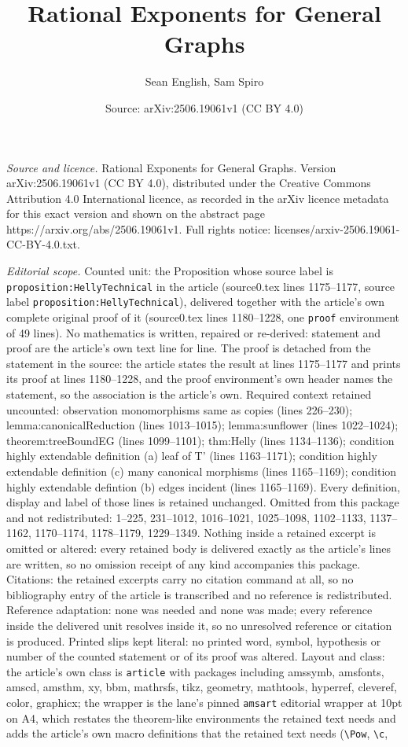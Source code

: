 \documentclass[10pt,a4paper]{amsart}
\title[Rational Exponents for General Graphs]{Rational Exponents for General Graphs}
\author{Sean English, Sam Spiro}
\date{Source: arXiv:2506.19061v1 (CC BY 4.0)}
\begin{document}
\maketitle

\noindent\emph{Source and licence.} Rational Exponents for General Graphs. Version arXiv:2506.19061v1 (CC BY 4.0), distributed under the Creative Commons Attribution 4.0 International licence, as recorded in the arXiv licence metadata for this exact version and shown on the abstract page https://arxiv.org/abs/2506.19061v1. Full rights notice: licenses/arxiv-2506.19061-CC-BY-4.0.txt.\par\smallskip

\noindent\textit{Editorial scope.} Counted unit: the Proposition whose source label is \texttt{proposition:HellyTechnical} in the article (source0.tex lines 1175--1177, source label \texttt{proposition:HellyTechnical}), delivered together with the article's own complete original proof of it (source0.tex lines 1180--1228, one \texttt{proof} environment of 49 lines). No mathematics is written, repaired or re-derived: statement and proof are the article's own text line for line. The proof is detached from the statement in the source: the article states the result at lines 1175--1177 and prints its proof at lines 1180--1228, and the proof environment's own header names the statement, so the association is the article's own. Required context retained uncounted: observation monomorphisms same as copies (lines 226--230); lemma:canonicalReduction (lines 1013--1015); lemma:sunflower (lines 1022--1024); theorem:treeBoundEG (lines 1099--1101); thm:Helly (lines 1134--1136); condition highly extendable definition (a) leaf of T' (lines 1163--1171); condition highly extendable definition (c) many canonical morphisms (lines 1165--1169); condition highly extendable defintion (b) edges incident (lines 1165--1169). Every definition, display and label of those lines is retained unchanged. Omitted from this package and not redistributed: 1--225, 231--1012, 1016--1021, 1025--1098, 1102--1133, 1137--1162, 1170--1174, 1178--1179, 1229--1349. Nothing inside a retained excerpt is omitted or altered: every retained body is delivered exactly as the article's lines are written, so no omission receipt of any kind accompanies this package. Citations: the retained excerpts carry no citation command at all, so no bibliography entry of the article is transcribed and no reference is redistributed. Reference adaptation: none was needed and none was made; every reference inside the delivered unit resolves inside it, so no unresolved reference or citation is produced. Printed slips kept literal: no printed word, symbol, hypothesis or number of the counted statement or of its proof was altered. Layout and class: the article's own class is \texttt{article} with packages including amssymb, amsfonts, amscd, amsthm, xy, bbm, mathrsfs, tikz, geometry, mathtools, hyperref, cleveref, color, graphicx; the wrapper is the lane's pinned \texttt{amsart} editorial wrapper at 10pt on A4, which restates the theorem-like environments the retained text needs and adds the article's own macro definitions that the retained text needs (\texttt{\textbackslash Pow}, \texttt{\textbackslash c}, 
\end{document}
